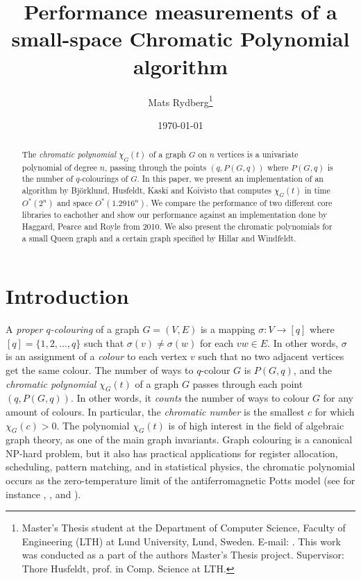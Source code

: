 \documentclass[a4paper]{article}
\title{\huge{Performance measurements of a small-space Chromatic Polynomial algorithm}}
\author{Mats Rydberg\thanks{Master's Thesis student at the Department of Computer Science, Faculty of Engineering (LTH) at Lund University, Lund, Sweden. E-mail: \code{dt08mr7@student.lth.se}. This work was conducted as a part of the authors Master's Thesis project. Supervisor: Thore Husfeldt, prof. in Comp. Science at LTH.}}
\date{\today}
\begin{document}
\maketitle

\begin{abstract}
The \emph{chromatic polynomial} $\chi_G(t)$ of a graph $G$ on $n$ vertices is a univariate polynomial of degree $n$, passing through the points $(q, P(G,q))$ where $P(G,q)$ is the number of $q$-colourings of $G$. In this paper, we present an implementation of an algorithm by Björklund, Husfeldt, Kaski and Koivisto that computes $\chi_G(t)$ in time $O^*(2^n)$ and space $O^*(1.2916^n)$. We compare the performance of two different core libraries to eachother and show our performance against an implementation done by Haggard, Pearce and Royle from 2010. 
We also present the chromatic polynomials for a small Queen graph and a certain graph specified by Hillar and Windfeldt.
\end{abstract}

\newpage

\section{Introduction}

A \emph{proper $q$-colouring} of a graph $G = (V, E)$ is a mapping $\sigma: V \rightarrow [q]$ where $[q] = \{1,2,\ldots,q\}$ such that $\sigma(v) \neq \sigma(w)$ for each $vw \in E$. In other words, $\sigma$ is an assignment of a \emph{colour} to each vertex $v$ such that no two adjacent vertices get the same colour.
The number of ways to $q$-colour $G$ is $P(G,q)$, and the \emph{chromatic polynomial} $\chi_G(t)$ of a graph $G$ passes through each point $(q, P(G,q))$. In other words, it \emph{counts} the number of ways to colour $G$ for any amount of colours.
In particular, the \emph{chromatic number} is the smallest $c$ for which $\chi_G(c) > 0$. The polynomial $\chi_G(t)$ is of high interest in the field of algebraic graph theory, as one of the main graph invariants. Graph colouring is a canonical NP-hard problem, but it also has practical applications for register allocation, scheduling, pattern matching, and in statistical physics, the chromatic polynomial occurs as the zero-temperature limit of the antiferromagnetic Potts model (see for instance \cite{chaitin}, \cite{marx}, and \cite{pottsmodel}).
\end{document}
